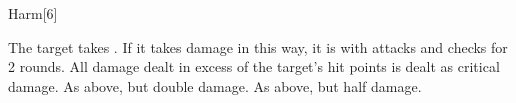 \begin{spellsection}{Harm}[6]
    \begin{spellheader}
    \end{spellheader}
    \begin{spellcontent}
        \begin{spelltargetinginfo}
        \end{spelltargetinginfo}
        \begin{spelleffects}
            \begin{spellattack}
                \spellsuccess The target takes . If it takes damage in this way, it is \impaired with attacks and checks for 2 rounds. All damage dealt in excess of the target's hit points is dealt as critical damage.
                \spellcritical As above, but double damage.
                \spellfailure As above, but half damage.
            \end{spellattack}
        \end{spelleffects}
    \end{spellcontent}
    \begin{spellfooter}
        \miscastrandom
    \end{spellfooter}
    \begin{spellaugments}
    \end{spellaugments}
\end{spellsection}

